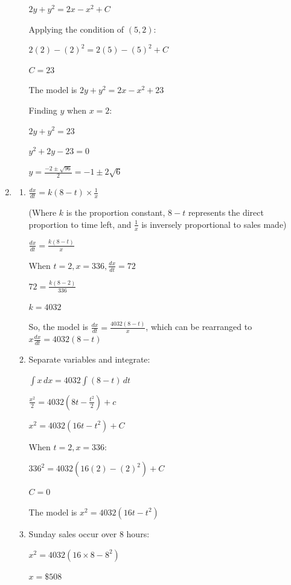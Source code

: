 \documentclass[../main.tex]{subfiles}
\begin{document}
\begin{spacing}{1.5}
\begin{enumerate}[itemsep=0.7cm]
\begin{enumerate}[itemsep=0.7cm]
        $2y+y^2=2x-x^2+C$

        Applying the condition of $(5,2)$:

        $2(2)-(2)^2=2(5)-(5)^2+C$

        $C=23$

        The model is $2y+y^2=2x-x^2+23$

        Finding $y$ when $x=2$:

        $2y+y^2=23$

        $y^2+2y-23=0$

        $y=\frac{-2 \pm \sqrt{96}}{2}=-1 \pm 2\sqrt{6}$
    
    \end{enumerate}

    \item 
    \begin{enumerate}[itemsep=0.7cm]
        \item 
        $\frac{dx}{dt}=k(8-t)\times \frac{1}{x}$

        (Where $k$ is the proportion constant, $8-t$ represents the direct proportion to time left, and $\frac{1}{x}$ is inversely proportional to sales made)
   
        $\frac{dx}{dt}=\frac{k(8-t)}{x}$

        When $t=2, x=336, \frac{dx}{dt}=72$

        $72=\frac{k(8-2)}{336}$

        $k=4032$

        So, the model is $\frac{dx}{dt}=\frac{4032(8-t)}{x}$, which can be rearranged to $x\frac{dx}{dt}=4032(8-t)$

        \item 
        Separate variables and integrate:

        $\int x\,dx=4032\int (8-t)\,dt$

        $\frac{x^2}{2}=4032(8t-\frac{t^2}{2})+c$

        $x^2=4032(16t-t^2)+C$

        When $t=2, x=336$:

        $336^2=4032(16(2)-(2)^2)+C$

        $C=0$

        The model is $x^2=4032(16t-t^2)$

        \item 
        Sunday sales occur over 8 hours:

        $x^2=4032(16\times 8 - 8^2)$

        $x=\$508$


\end{enumerate}
\end{enumerate}
\end{spacing}
\end{document}
